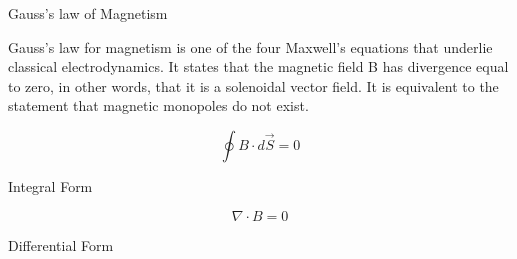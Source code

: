 

\begin{center}
Gauss's law of Magnetism
\end{center}
\begin{flushleft}
 Gauss's law for magnetism is one of the four Maxwell's equations that underlie classical electrodynamics. It states that the magnetic field B has divergence equal to zero, in other words, that it is a solenoidal vector field. It is equivalent to the statement that magnetic monopoles do not exist.
\end{flushleft}

\begin{equation}\label{Integ}
    \oint B\cdot d\overrightarrow{\! S}= 0
    \end{equation}
\begin{center}
Integral Form
\end{center}

\begin{equation}\label{Diff}
    \nabla \cdot{B} = 0
\end{equation}
\begin{center}
Differential Form
\end{center}






